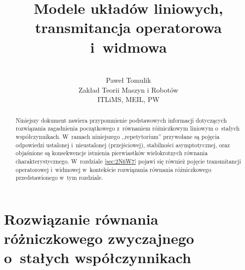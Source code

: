 \documentclass[paper=a4,DIV=12]{lpas}
\begin{document}
\subject{Laboratorium pomiarów, automatyki i~sterowania~I}


\title{Modele układów liniowych, transmitancja operatorowa i~widmowa}

\author{\\Paweł Tomulik\\ Zakład Teorii Maszyn i Robotów\\ ITLiMS, MEIL, PW}
\date{}
\maketitle

\pagebreak
\tableofcontents
\pagebreak

\begin{abstract}
  \noindent Niniejszy dokument zawiera przypomnienie podstawowych informacji
  dotyczących rozwiązania zagadnienia początkowego z~równaniem różniczkowym
  liniowym o~stałych współczynnikach. W~ramach niniejszego ,,repetytorium''
  przywołane są pojęcia odpowiedzi ustalonej i~nieustalonej (przejściowej),
  stabilności asymptotycznej, oraz objaśnione są konsekwencje istnienia
  pierwiastków wielokrotnych równania charakterystycznego. W~rozdziale
  \ref{sec:2N6W7} pojawi się również pojęcie transmitancji operatorowej
  i~widmowej w~kontekście rozwiązania równania różniczkowego przedstawionego
  w~tym rozdziale.
\end{abstract}


\section{Rozwiązanie równania różniczkowego zwyczajnego o~stałych
         współczynnikach}
\label{sec:BVHF3}
\end{document}
